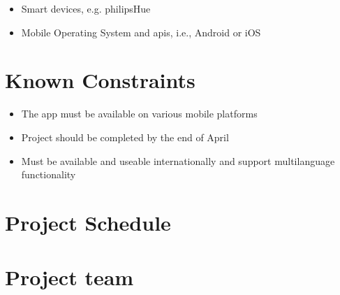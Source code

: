 \documentclass[11pt]{article}
\begin{document}
\begin{itemize}
\item
  Smart devices, e.g. \gls{philipsHue}
\item
  Mobile Operating System and \glspl{api}, i.e., Android or iOS
\end{itemize}


%
\section{Known Constraints}\label{known-constraints}

\begin{itemize}
 \item The app must be available on various mobile platforms
 \item Project should be completed by the end of April
 \item Must be available and useable internationally and support multilanguage functionality
 
\end{itemize}


%
\section{Project Schedule}\label{project-schedule}




%
\section{Project team}\label{project-team}
\end{document}
